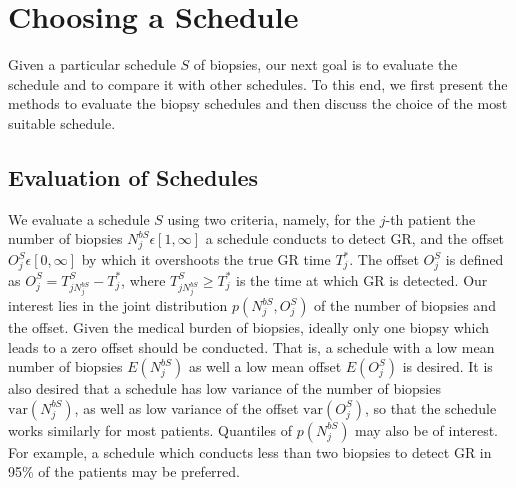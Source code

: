 
\section{Choosing a Schedule}
\label{sec : choosing_schedule}
Given a particular schedule $S$ of biopsies, our next goal is to evaluate the schedule and to compare it with other schedules. To this end, we first present the methods to evaluate the biopsy schedules and then discuss the choice of the most suitable schedule.

\subsection{Evaluation of Schedules}
We evaluate a schedule $S$ using two criteria, namely, for the $j$-th patient the number of biopsies $N^{bS}_j \epsilon [1, \infty]$ a schedule conducts to detect GR, and the offset $O^S_j \epsilon [0, \infty]$ by which it overshoots the true GR time $T^*_j$. The offset $O^S_j$ is defined as $O^S_j = T^S_{j{N^{bS}_j}} - T^*_j$, where $T^S_{j{N^{bS}_j}} \geq T^*_j$ is the time at which GR is detected. Our interest lies in the joint distribution $p(N^{bS}_j, O^S_j)$ of the number of biopsies and the offset. Given the medical burden of biopsies, ideally only one biopsy which leads to a zero offset should be conducted. That is, a schedule with a low mean number of biopsies $E(N^{bS}_j)$ as well a low mean offset $E(O^S_j)$ is desired. It is also desired that a schedule has low variance of the number of biopsies $\mbox{var}(N^{bS}_j)$, as well as low variance of the offset $\mbox{var}(O^S_j)$, so that the schedule works similarly for most patients. Quantiles of $p(N^{bS}_j)$ may also be of interest. For example, a schedule which conducts less than two biopsies to detect GR in 95\% of the patients may be preferred.

